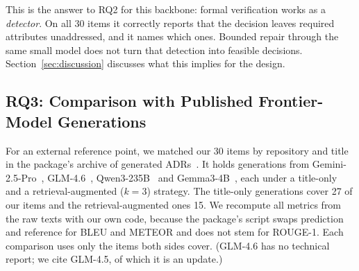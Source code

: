 \documentclass[preprint,12pt,authoryear]{elsarticle}
\renewcommand{\_}{\textunderscore\allowbreak{}}
\begin{document}
This is the answer to RQ2 for this backbone: formal verification works as a \emph{detector}. On all 30 items it correctly reports that the decision leaves required attributes unaddressed, and it names which ones. Bounded repair through the same small model does not turn that detection into feasible decisions. Section~\ref{sec:discussion} discusses what this implies for the design.

\subsection{RQ3: Comparison with Published Frontier-Model Generations}
\label{sec:published-comparison}

For an external reference point, we matched our 30 items by repository and title in the package's archive of generated ADRs~\citep{contextmatters-zenodo}. It holds generations from Gemini-2.5-Pro~\citep{gemini25}, GLM-4.6~\citep{glm45}, Qwen3-235B~\citep{qwen3} and Gemma3-4B~\citep{gemma3}, each under a title-only and a retrieval-augmented ($k=3$) strategy. The title-only generations cover 27 of our items and the retrieval-augmented ones 15. We recompute all metrics from the raw texts with our own code, because the package's script swaps prediction and reference for BLEU and METEOR and does not stem for ROUGE-1. Each comparison uses only the items both sides cover. (GLM-4.6 has no technical report; we cite GLM-4.5, of which it is an update.)
\end{document}
